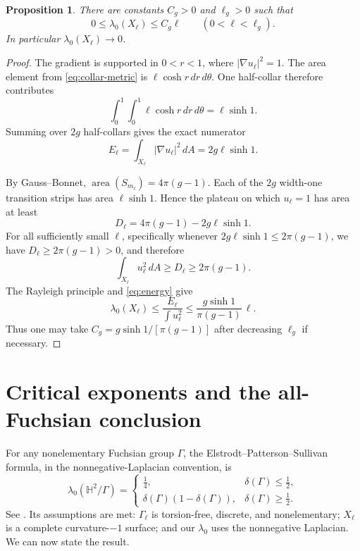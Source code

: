 \documentclass[11pt]{article}
\newtheorem{proposition}[theorem]{Proposition}
\theoremstyle{definition}
\newcommand{\Hh}{\mathbb H^2}
\newcommand{\lamzero}{\lambda_0}
\begin{document}
\begin{proposition}\label{prop:lambda}
There are constants $C_g>0$ and $\ell_g>0$ such that
\[
 0\le \lamzero(X_\ell)\le
 C_g\ell
 \qquad(0<\ell<\ell_g).
\]
In particular $\lamzero(X_\ell)\to0$.
\end{proposition}

\begin{proof}
The gradient is supported in $0<r<1$, where
$|\nabla u_\ell|^2=1$.  The area element from
\eqref{eq:collar-metric} is $\ell\cosh r\,dr\,d\theta$.  One half-collar
therefore contributes
\[
 \int_0^1\!\int_0^1 \ell\cosh r\,dr\,d\theta
 =\ell\sinh1.
\]
Summing over $2g$ half-collars gives the exact numerator
\begin{equation}\label{eq:energy}
 E_\ell=\int_{X_\ell}|\nabla u_\ell|^2\,dA
 =2g\ell\sinh1.
\end{equation}

By Gauss--Bonnet, $\operatorname{area}(S_{m_\ell})=4\pi(g-1)$.  Each of the
$2g$ width-one transition strips has area $\ell\sinh1$.  Hence the plateau on
which $u_\ell=1$ has area at least
\begin{equation}\label{eq:core-area}
 D_\ell=4\pi(g-1)-2g\ell\sinh1.
\end{equation}
For all sufficiently small $\ell$, specifically whenever
$2g\ell\sinh1\le2\pi(g-1)$, we have
$D_\ell\ge2\pi(g-1)>0$, and therefore
\[
 \int_{X_\ell}u_\ell^2\,dA\ge D_\ell\ge2\pi(g-1).
\]
The Rayleigh principle and \eqref{eq:energy} give
\[
 \lamzero(X_\ell)
 \le\frac{E_\ell}{\int u_\ell^2}
 \le\frac{g\sinh1}{\pi(g-1)}\,\ell.
\]
Thus one may take $C_g=g\sinh1/[\pi(g-1)]$ after decreasing $\ell_g$ if
necessary.
\end{proof}

\section{Critical exponents and the all-Fuchsian conclusion}

For any nonelementary Fuchsian group $\Gamma$, the
Elstrodt--Patterson--Sullivan formula, in the nonnegative-Laplacian convention,
is
\begin{equation}\label{eq:eps}
 \lamzero(\Hh/\Gamma)=
 \begin{cases}
  \tfrac14, & \delta(\Gamma)\le\tfrac12,\\[2mm]
  \delta(\Gamma)(1-\delta(\Gamma)), & \delta(\Gamma)\ge\tfrac12.
 \end{cases}
\end{equation}
See \citet[Theorem~2.17, p.~333]{Sullivan1987}.  Its assumptions are met:
$\Gamma_\ell$ is torsion-free, discrete, and nonelementary; $X_\ell$ is a
complete curvature-$-1$ surface; and our $\lamzero$ uses the nonnegative
Laplacian.  We can now state the result.
\end{document}
